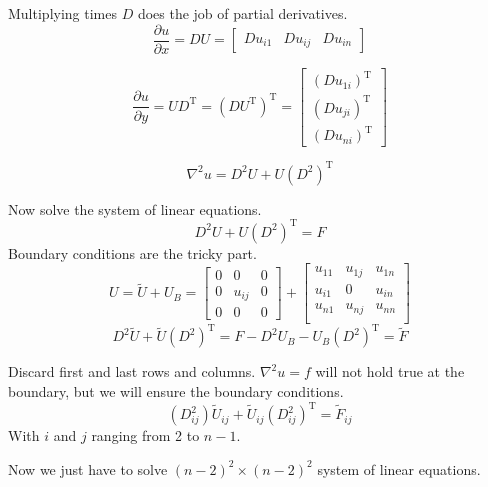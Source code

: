 \documentclass{beamer}
\newcommand{\trans}{\text{T}}
\begin{document}
\begin{frame}{Multiplying times $D$ does the job of partial derivatives.}{}
\begin{equation*}
\frac{\partial u}{\partial x} = DU = \begin{bmatrix}
Du_{i1} & Du_{ij} & Du_{in}
\end{bmatrix}
\end{equation*}

\begin{equation*}
\frac{\partial u}{\partial y} = UD^\trans = (DU^\trans)^\trans = \begin{bmatrix}
(Du_{1i})^\trans \\ (Du_{ji})^\trans \\ (Du_{ni})^\trans
\end{bmatrix}
\end{equation*}

\begin{equation*}
\nabla^2 u = D^2 U + U (D^2)^\trans
\end{equation*}
\end{frame}

\begin{frame}{Now solve the system of linear equations.}{}
\begin{equation*}
D^2 U + U (D^2)^\trans = F
\end{equation*}
Boundary conditions are the tricky part.
\begin{equation*}
U=\tilde{U}+U_B=
\begin{bmatrix}
0 & 0 & 0\\
0 & u_{ij} & 0\\
0 & 0 & 0
\end{bmatrix}+
\begin{bmatrix}
u_{11} & u_{1j} & u_{1n}\\
u_{i1} &    0   & u_{in}\\
u_{n1} & u_{nj} & u_{nn}\\
\end{bmatrix}
\end{equation*}
\begin{equation*}
D^2 \tilde{U} + \tilde{U} (D^2)^\trans = F - D^2 U_B - U_B (D^2)^\trans = \tilde{F}
\end{equation*}
\end{frame}

\begin{frame}{Discard first and last rows and columns.}{}
$\nabla^2u=f$ will not hold true at the boundary, but we will ensure the boundary conditions.
\begin{equation*}
(D^2_{ij}) \tilde{U}_{ij} + \tilde{U}_{ij} (D^2_{ij})^\trans = \tilde{F}_{ij}
\end{equation*}
With $i$ and $j$ ranging from 2 to $n-1$.

\bigskip
Now we just have to solve $(n-2)^2 \times (n-2)^2$ system of linear equations.
\end{frame}
\end{document}
